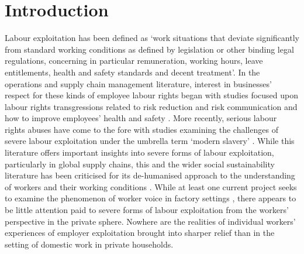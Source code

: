 \documentclass[
  12pt,
  letterpaper,
  DIV=11,
  numbers=noendperiod]{scrartcl}
\theoremstyle{plain}
\theoremstyle{definition}
\renewcommand*\contentsname{Table of contents}
\newcommand\contentsname{Table of contents}
\begin{document}
\renewcommand*\contentsname{Table of contents}
{
\hypersetup{linkcolor=}
\setcounter{tocdepth}{3}
\tableofcontents
}

\newpage

\section{Introduction}\label{introduction}

Labour exploitation has been defined as `work situations that deviate 
significantly from standard working conditions as defined by legislation
or other binding legal regulations, concerning in particular
remuneration, working hours, leave entitlements, health and safety
standards and decent treatment'\autocite[10]{european_union_for_fundamental_rights_severe_2015}. In the operations and supply chain management literature,
interest in businesses' respect for these kinds of employee labour rights began with
studies focused upon labour rights transgressions related to risk
reduction and risk communication and how to improve
employees' health and safety \autocite{chinander_aligning_2001,wolf_operationalizing_2001}. More recently, 
serious labour rights abuses have come to the fore with studies
examining the challenges of severe labour exploitation under the umbrella term `modern slavery' \autocite{gold_modern_2015,new_modern_2015,benstead_horizontal_2018,stevenson_modern_2018}. While this literature
offers important insights into severe forms of labour exploitation, particularly
in global supply chains, this and the wider social sustainability literature has
been criticised for its de-humanised approach to the understanding
of workers and their working conditions \autocite{soundararajan_humanizing_2021}. While at least one current
project seeks to examine the phenomenon of worker voice in factory
settings  \autocite{leverhulme_trust_research_2022}, there appears to be little attention paid to severe forms of labour exploitation from the workers' perspective in the private sphere. Nowhere are the realities of individual workers' experiences of employer exploitation brought into sharper relief than in the setting of domestic
work in private households.
\end{document}
